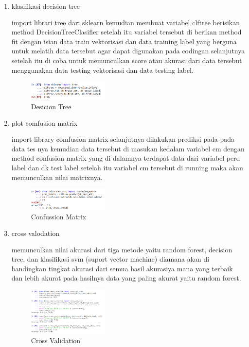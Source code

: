 \begin{enumerate}
        \item klasifikasi decision tree \hfill \break 
        
        import librari tree dari sklearn kemudian membuat variabel clftree berisikan method DecisionTreeClasifier setelah itu variabel tersebut di berikan method fit dengan isian data train vektorisasi dan data training label yang berguna untuk melatih data tersebut agar dapat digunakan pada codingan selanjutnya setelah itu di coba untuk memunculkan score atau akurasi dari data tersebut menggunakan data testing vektorisasi dan data testing label.
        \begin{figure}[H]
            \includegraphics[width=4cm]{figures/1174086/chapter4/5.png}
            \centering
            \caption{Desicion Tree}
        \end{figure}

        \item plot comfusion matrix \hfill \break 
        
        import library comfusion matrix selanjutnya dilakukan prediksi pada pada data tes nya kemudian data tersebut di masukan kedalam variabel cm dengan method confusion matrix yang di dalamnya terdapat data dari variabel perd label dan dk test label setelah itu variabel cm tersebut di running maka akan memunculkan nilai matrixnya. 
        \begin{figure}[H]
            \includegraphics[width=4cm]{figures/1174086/chapter4/6.png}
            \centering
            \caption{Confussion Matrix}
        \end{figure}

        \item cross valodation \hfill \break 
        
        memunculkan nilai akurasi dari tiga metode yaitu random forest, decision tree, dan klasifikasi svm (suport vector machine) diamana akan di bandingkan tingkat akurasi dari semua hasil akurasiya mana yang terbaik dan lebih akurat pada hasilnya data yang paling akurat yaitu random forest.
        \begin{figure}[H]
            \includegraphics[width=4cm]{figures/1174086/chapter4/7.png}
            \centering
            \caption{Cross Validation}
        \end{figure}


\end{enumerate}
